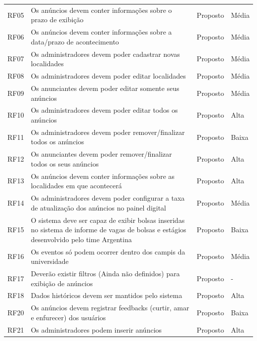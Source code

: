 \documentclass[a4paper, 12pt]{article}
\begin{document}
\begin{table}[ht]
    \centering

    \begin{tabular}{p{2cm}p{7cm}p{2cm}p{2cm}}
        \hline

        RF05&Os an\'{u}ncios devem conter informa\c{c}\~{o}es sobre o prazo de exibi\c{c}\~{a}o&Proposto&M\'{e}dia\\
        RF06&Os an\'{u}ncios devem conter informa\c{c}\~{o}es sobre a data/prazo de acontecimento&Proposto&M\'{e}dia\\
        RF07&Os administradores devem poder cadastrar novas localidades&Proposto&M\'{e}dia\\
        RF08&Os administradores devem poder editar localidades&Proposto&M\'{e}dia\\
        RF09&Os anunciantes devem poder editar somente seus an\'{u}ncios&Proposto&M\'{e}dia\\
        RF10&Os administradores devem poder editar todos os an\'{u}ncios&Proposto&Alta\\
        RF11&Os administradores devem poder remover/finalizar todos os an\'{u}ncios&Proposto&Baixa\\
        RF12&Os anunciantes devem poder remover/finalizar todos os seus an\'{u}ncios&Proposto&Alta\\
        RF13&Os an\'{u}ncios devem conter informa\c{c}\~{o}es sobre as localidades em que acontecer\'{a}&Proposto&Alta\\
        RF14&Os administradores devem poder configurar a taxa de atualiza\c{c}\~{a}o dos an\'{u}ncios no painel digital&Proposto&M\'{e}dia\\
        RF15&O sistema deve ser capaz de exibir bolsas inseridas no sistema de informe de vagas de bolsas e estágios desenvolvido pelo time Argentina&Proposto&Baixa\\
        RF16&Os eventos s\'{o} podem ocorrer dentro dos campis da universidade&Proposto&M\'{e}dia\\
        RF17&Dever\~{a}o existir filtros (Ainda n\~{a}o definidos) para exibi\c{c}\~{a}o de an\'{u}ncios&Proposto&-\\
        RF18&Dados hist\'{o}ricos devem ser mantidos pelo sistema&Proposto&Alta \\
        RF20&Os an\'{u}ncios devem registrar feedbacks (curtir, amar e enfurecer) dos usu\'{a}rios&Proposto&Baixa\\
        RF21&Os administradores podem inserir an\'{u}ncios&Proposto&Alta\\
		\hline
	\end{tabular}
\end{table}
\newpage
\end{document}
